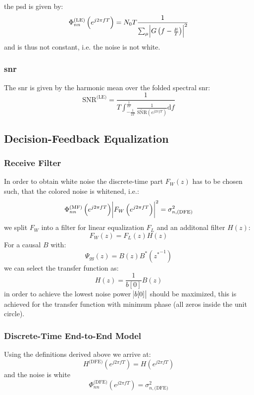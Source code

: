 the \ac{psd} is given by:
\begin{equation}
    \Phi_{nn}^\text{(LE)} \left(e^{j 2 \pi f T}\right)
    = N_0 T \frac{1}{\sum_\mu \abs{G\left(f-\frac{\mu}{T}\right)}^2}
\end{equation}
and is thus not constant, i.e. the noise is not white.

\subsubsection{\acl{snr}}
The \ac{snr} is given by the harmonic mean over the folded spectral \ac{snr}:
\begin{equation}
    \text{SNR}^\text{(LE)} = \frac{1}{T \int_{-\frac{1}{2T}}^\frac{1}{2T} 
        \frac{1}{\tilde{\text{SNR}}\left(e^{j 2 \pi f T}\right)}\text{d}f}
\end{equation}

\subsection{Decision-Feedback Equalization}
\subsubsection{Receive Filter}
In order to obtain white noise the discrete-time part $F_W(z)$ has to be chosen such, that
the colored noise is whitened, i.e.:
\begin{equation}
    \Phi_{nn}^\text{(MF)}\left(e^{j 2 \pi f T}\right) 
        \abs{F_W\left(e^{j 2 \pi f T}\right)}^2 = \sigma_{n, \text{(DFE)}}^2
\end{equation}
we split $F_W$ into a filter for linear equalization $F_L$ and an additonal filter $H(z)$:
\begin{equation}
    F_W(z) = F_L(z) H(z)
\end{equation}
For a causal $B$ with:
\begin{equation}
    \Psi_{gg}(z) = B(z) B^*({z^*}^{-1})
\end{equation}
we can select the transfer function as:
\begin{equation}
    H(z) = \frac{1}{b[0]} B(z)
\end{equation}
in order to achieve the lowest noise power $\abs{b[0]}$ should be maximized, this
is achieved for the transfer function with minimum phase (all zeros inside the
unit circle).

\subsubsection{Discrete-Time End-to-End Model}
Using the definitions derived above we arrive at:
\begin{equation}
    H^\text{(DFE)}(e^{j 2 \pi f T}) = H(e^{j 2 \pi f T})
\end{equation}
and the noise is white
\begin{equation}
    \Phi_{nn}^\text{(DFE)}(e^{j 2 \pi f T}) = \sigma^2_{n, \text{(DFE)}}
\end{equation}

